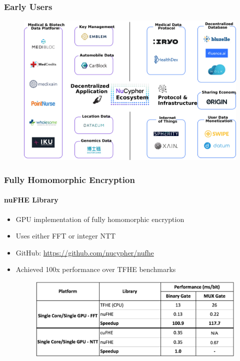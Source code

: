 \documentclass[xetex,mathsans,sans,aspectratio=169]{beamer}
\begin{document}
    \begin{frame}
      \frametitle{Early Users}
      \begin{figure}
           \includegraphics[width=11.5cm]{pdf/projects.pdf}
      \end{figure}
    \end{frame}

    \begin{frame}
      \frametitle{Fully Homomorphic Encryption}
       \framesubtitle{nuFHE Library}
       \begin{itemize}
           \item GPU implementation of fully homomorphic encryption
           \item Uses either FFT or integer NTT
           \item GitHub: \url{https://github.com/nucypher/nufhe}
           \item Achieved 100x performance over TFHE benchmarks
           \begin{figure}
               \includegraphics[width=10.5cm]{pdf/nufhe-benchmarks.pdf}
           \end{figure}
       \end{itemize}
    \end{frame}
\end{document}
